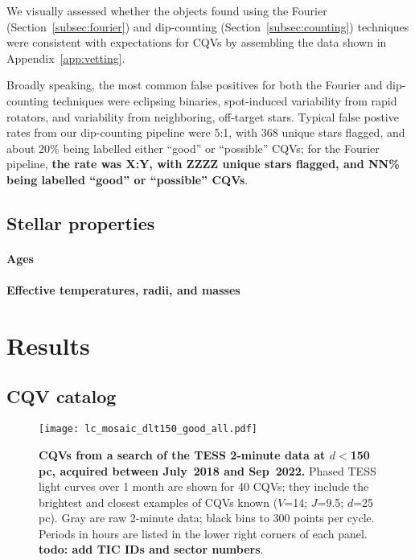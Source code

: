 \documentclass[11pt,twocolumn,tighten]{aastex63}
\begin{document}
We visually assessed whether the objects found using the Fourier
(Section~\ref{subsec:fourier}) and dip-counting
(Section~\ref{subsec:counting}) techniques were consistent with
expectations for CQVs by assembling the data shown in
Appendix~\ref{app:vetting}.

Broadly speaking, the most common false positives for both the Fourier
and dip-counting techniques were eclipsing binaries, spot-induced
variability from rapid rotators, and variability from neighboring,
off-target stars.  Typical false postive rates from our dip-counting
pipeline were 5:1, with 368 unique stars flagged, and about 20\% being
labelled either ``good'' or ``possible'' CQVs; for the Fourier
pipeline, {\bf the rate was X:Y, with ZZZZ unique stars flagged, and
NN\% being labelled ``good'' or ``possible'' CQVs}.


\subsection{Stellar properties}

\paragraph{Ages}

\paragraph{Effective temperatures, radii, and masses}



\section{Results}
\label{sec:results}

\subsection{CQV catalog}

\begin{figure*}[!t]
	\begin{center}
    \centering
    \texttt{[image: lc\_mosaic\_dlt150\_good\_all.pdf]}
		\caption{
			{\bf CQVs from a search of the TESS 2-minute data at
      $d$$<$150\,pc, acquired between July~2018 and Sep~2022.}
      Phased TESS light curves over 1 month are shown for 40 CQVs;
      they include the brightest and closest examples of CQVs known
      ($V$=14; $J$=9.5; $d$=25\,pc).  Gray are raw 2-minute data;
      black bins to 300 points per cycle.  Periods in hours are listed
      in the lower right corners of each panel.
      {\bf todo:  add TIC IDs and sector numbers}.
		}
		\label{fig:singlemosaic}
	\end{center}
\end{figure*}
\end{document}
